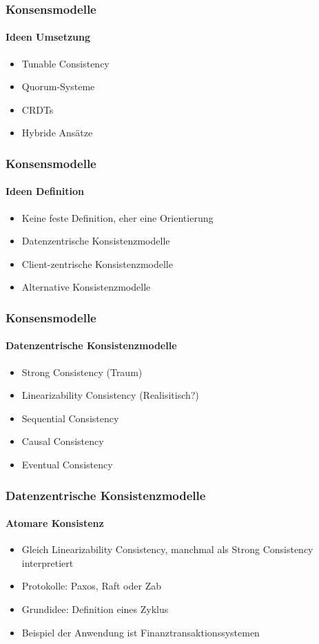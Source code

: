 \begin{frame}
  \frametitle{Konsensmodelle}
  \framesubtitle{Ideen Umsetzung}
  \begin{itemize}
    \item Tunable Consistency
    \item Quorum-Systeme
    \item CRDTs 
    \item Hybride Ansätze
  \end{itemize}
\end{frame}

\begin{frame}
  \frametitle{Konsensmodelle}
  \framesubtitle{Ideen Definition}
  \begin{itemize}
    \item Keine feste Definition, eher eine Orientierung
    \item Datenzentrische Konsistenzmodelle
    \item Client-zentrische Konsistenzmodelle
    \item Alternative Konsistenzmodelle
  \end{itemize}
\end{frame}


\begin{frame}
  \frametitle{Konsensmodelle}
  \framesubtitle{Datenzentrische Konsistenzmodelle}
  \begin{itemize}
    \item Strong Consistency (Traum)
    \item Linearizability Consistency (Realisitisch?)
    \item Sequential Consistency 
    \item Causal Consistency
    \item Eventual Consistency
  \end{itemize}
\end{frame}


\begin{frame}
  \frametitle{Datenzentrische Konsistenzmodelle}
  \framesubtitle{Atomare Konsistenz}
  \begin{itemize}
    \item Gleich Linearizability Consistency, manchmal als Strong Consistency interpretiert
    \item Protokolle:  Paxos, Raft oder Zab
    \item Grundidee: Definition eines Zyklus 
    \item Beispiel der Anwendung ist Finanztransaktionssystemen
  \end{itemize}
\end{frame}

